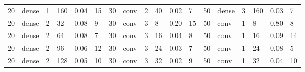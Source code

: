 \begin{table}
{\begin{tabular}{@{}llllll|llllll|llllll@{}}
20                              & dense                          & 1                              & 160                            & 0.04                             & 15                                & 30                              & conv                           & 2                              & 40                             & 0.02                           & 7                                 & 50                              & dense                          & 3                              & 160                            & 0.03                           & 7                                \\
20                              & dense                          & 2                              & 32                             & 0.08                             & 9                                 & 30                              & conv                           & 3                              & 8                              & 0.20                           & 15                                & 50                              & conv                           & 1                              & 8                              & 0.80                           & 8                                \\
20                              & dense                          & 2                              & 64                             & 0.08                             & 7                                 & 30                              & conv                           & 3                              & 16                             & 0.04                           & 8                                 & 50                              & conv                           & 1                              & 16                             & 0.09                           & 14                               \\
20                              & dense                          & 2                              & 96                             & 0.06                             & 12                                & 30                              & conv                           & 3                              & 24                             & 0.03                           & 7                                 & 50                              & conv                           & 1                              & 24                             & 0.08                           & 5                                \\
20                              & dense                          & 2                              & 128                            & 0.05                             & 10                                & 30                              & conv                           & 3                              & 32                             & 0.02                           & 9                                 & 50                              & conv                           & 1                              & 32                             & 0.04                           & 10                               \\

\end{tabular}}
\end{table}
